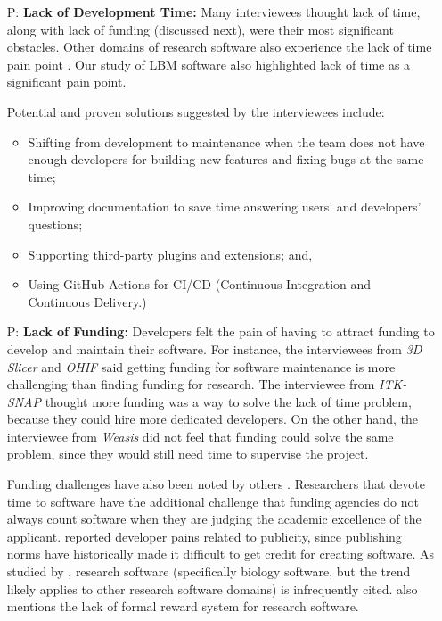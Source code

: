 \documentclass[final, 12pt, 3p, times]{elsarticle}
\newcounter{pnum} %
\begin{document}
\begin{enumerate}

\item[P\refstepcounter{pnum}\thepnum \label{P_LackDevTime}:] \textbf{Lack of
Development Time:} Many interviewees thought lack of time, along with lack of
funding (discussed next), were their most significant obstacles. Other domains
of research software also experience the lack of time pain point
\cite{PintoEtAl2018, PintoEtAl2016, WieseEtAl2019}. Our study of LBM software
\cite{SmithEtAl2024} also highlighted lack of time as a significant pain point.

Potential and proven solutions suggested by the interviewees include:

\begin{itemize}
\item Shifting from development to maintenance when the team does not have
enough developers for building new features and fixing bugs at the same time;
\item Improving documentation to save time answering users' and developers'
questions;
\item Supporting third-party plugins and extensions; and,
\item Using GitHub Actions for CI/CD (Continuous Integration and Continuous
Delivery.)
\end{itemize}

\item[P\refstepcounter{pnum}\thepnum \label{P_LackFunding}:] \textbf{Lack of
Funding:} Developers felt the pain of having to attract funding to develop and
maintain their software. For instance, the interviewees from \textit{3D Slicer}
and \textit{OHIF} said getting funding for software maintenance is more
challenging than finding funding for research. The interviewee from 
\textit{ITK-SNAP} thought more funding was a way to solve the lack of time
problem, because they could hire more dedicated developers. On the other hand,
the interviewee from \textit{Weasis} did not feel that funding could
solve the same problem, since they would still need time to supervise the project. 

Funding challenges have also been noted by others \cite{GewaltigAndCannon2012,
Goble2014, KaterbowAndFeulner2018, SmithEtAl2024}. Researchers that devote time
to software have the additional challenge that funding agencies do not always
count software when they are judging the academic excellence of the applicant.
\cite{WieseEtAl2019} reported developer pains related to publicity, since
publishing norms have historically made it difficult to get credit for creating
software.  As studied by \cite{HowisonAndBullard2016}, research software
(specifically biology software, but the trend likely applies to other research
software domains) is infrequently cited. \cite{PintoEtAl2018} also mentions the
lack of formal reward system for research software.


\end{enumerate}
\end{document}
